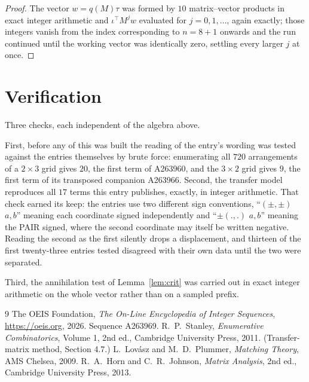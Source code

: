 \documentclass[11pt,a4paper]{article}
\theoremstyle{plain}
\theoremstyle{definition}
\begin{document}
\begin{proof}
The vector $w=q(M)\tau$ was formed by $10$ matrix--vector products in exact integer
arithmetic and $\iota^{\!\top}M^{j}w$ evaluated for $j=0,1,\dots$, again exactly; those
integers vanish from the index corresponding to $n=8+1$ onwards and the run continued
until the working vector was identically zero, settling every larger $j$ at once.
\end{proof}

\section{Verification}

Three checks, each independent of the algebra above.

First, before any of this was built the reading of the entry's wording was tested against the
entries themselves by brute force: enumerating all $720$ arrangements of a $2\times3$ grid
gives $20$, the first term of A263960, and the $3\times2$ grid gives $9$, the first term of its
transposed companion A263966. Second, the transfer model reproduces all $17$ terms this
entry publishes, exactly, in integer arithmetic. That check earned its keep: the entries use
two different sign conventions, ``$(\pm,\pm)$ $a,b$'' meaning each coordinate signed
independently and ``$\pm(.,.)$ $a,b$'' meaning the PAIR signed, where the second coordinate may
itself be written negative. Reading the second as the first silently drops a displacement, and
thirteen of the first twenty-three entries tested disagreed with their own data until the two
were separated.

Third, the annihilation test of Lemma~\ref{lem:crit} was carried out in exact integer
arithmetic on the whole vector rather than on a sampled prefix.

\begin{thebibliography}{9}
 The OEIS Foundation, \emph{The On-Line Encyclopedia of Integer
Sequences}, \url{https://oeis.org}, 2026. Sequence A263969.
 R.~P.~Stanley, \emph{Enumerative Combinatorics}, Volume 1, 2nd ed.,
Cambridge University Press, 2011. (Transfer-matrix method, Section 4.7.)
 L.~Lov\'asz and M.~D.~Plummer, \emph{Matching Theory}, AMS Chelsea, 2009.
 R.~A.~Horn and C.~R.~Johnson, \emph{Matrix Analysis}, 2nd ed., Cambridge
University Press, 2013.
\end{thebibliography}
\end{document}

